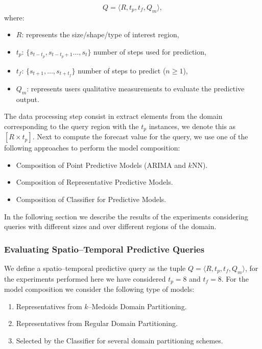 \begin{equation*} 
Q = \langle R, t_{p}, t_{f}, Q_{m} \rangle,
\end{equation*}
where:
\begin{itemize}[noitemsep,nolistsep]	
	\item $R$: represents the size/shape/type of interest region,
	\item $t_{p}$: $\{s_{t-t_p}, s_{t-t_{p}+1}\ldots, s_{t}\}$ number of steps used for  prediction,
	\item $t_{f}$: $\{s_{t+1}, \ldots, s_{t+t_f}\}$ number of steps to predict ($n\geq 1$),
	\item $Q_{m}$: represents users qualitative measurements to evaluate the predictive output.
\end{itemize}

The data processing step consist in extract elements from the domain corresponding to the query region with the $t_p$ instances, we denote this as $[R \times t_{p}]$. Next to compute the forecast value for the query, we use one of the following approaches to perform the model composition:

\begin{itemize}
	\item Composition of Point Predictive Models (ARIMA and $k$NN).
	\item Composition of Representative Predictive Models.
	\item Composition of Classifier for Predictive Models.	
\end{itemize}

In the following section we describe the results of the experiments considering queries with different sizes and over different regions of the domain.

\subsubsection{Evaluating Spatio--Temporal Predictive Queries}
\label{Sec:ExperimentsQueries}

We define a spatio--temporal predictive query as the tuple $Q = \langle R, t_{p}, t_{f}, Q_{m} \rangle$, for the experiments performed here we have considered $t_{p} = 8$ and $t_{f} = 8$. For the model composition we consider the following type of models:

\begin{enumerate}
	\item Representatives from $k$--Medoids Domain Partitioning.
	\item Representatives from Regular Domain Partitioning.
	\item Selected by the Classifier for several domain partitioning schemes.
\end{enumerate}

